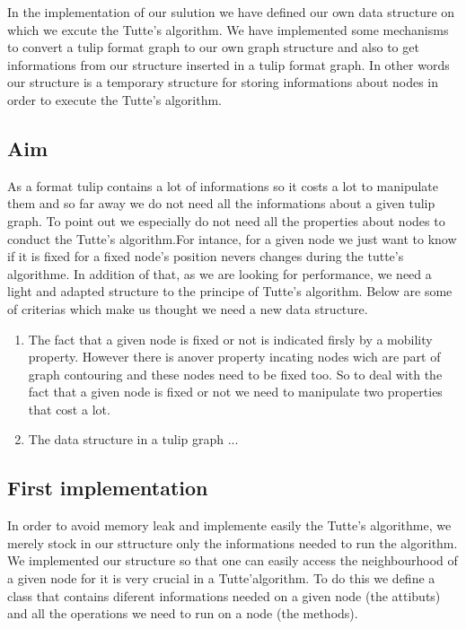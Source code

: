 In the implementation of our sulution we have defined our own data structure on which we excute the Tutte's algorithm. We have implemented some mechanisms to convert a tulip format graph to our own graph structure and also to get informations from our structure inserted in a tulip format graph. In other words our structure is a temporary structure for storing informations about nodes in order to execute the Tutte's algorithm.

\subsection{Aim}
As a format tulip contains a lot of informations so it costs a lot to manipulate them and so far away we do not need all the informations about a given tulip graph. To point out we especially do not need all the properties about nodes to conduct the Tutte's algorithm.For intance, for a given node we just want to know if it is fixed for a fixed node's position nevers changes during the tutte's algorithme. In addition of that, as we are looking for performance, we need a light and adapted structure to the principe of Tutte's algorithm. Below are some of criterias which make us thought we need a new data structure.
\begin{enumerate}
\item The fact that a given node is fixed or not is indicated firsly by a mobility property. However there is anover property incating nodes wich are part of graph contouring and these nodes need to be fixed too. So to deal with the fact that a given node is fixed or not we need to manipulate two properties that cost a lot.

\item The data structure in a tulip graph ...

\end{enumerate}  

\subsection{First implementation}
In order to avoid memory leak and implemente easily the Tutte's algorithme, we merely stock in our sttructure only the informations needed to run the algorithm. We implemented our structure so that one can easily access the neighbourhood of a given node for it is very crucial in a Tutte'algorithm. To do this we define a class that contains diferent informations needed on a given node (the attibuts) and all the operations we need to run on a node (the methods).

